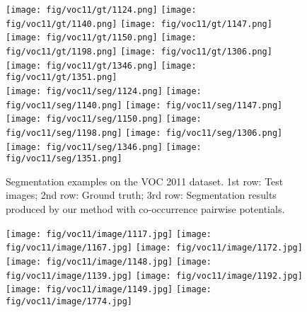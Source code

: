 \documentclass[10pt,3p]{elsarticle}
\begin{document}
\begin{figure}[!t]
	\texttt{[image: fig/voc11/gt/1124.png]}
     \texttt{[image: fig/voc11/gt/1140.png]}     
	\texttt{[image: fig/voc11/gt/1147.png]}
	\texttt{[image: fig/voc11/gt/1150.png]}
     \texttt{[image: fig/voc11/gt/1198.png]}
     \texttt{[image: fig/voc11/gt/1306.png]}   
     \texttt{[image: fig/voc11/gt/1346.png]} 
     \texttt{[image: fig/voc11/gt/1351.png]}\\
 
       
     \texttt{[image: fig/voc11/seg/1124.png]}
     \texttt{[image: fig/voc11/seg/1140.png]}     
	\texttt{[image: fig/voc11/seg/1147.png]}
    \texttt{[image: fig/voc11/seg/1150.png]}
     \texttt{[image: fig/voc11/seg/1198.png]}
     \texttt{[image: fig/voc11/seg/1306.png]}   
     \texttt{[image: fig/voc11/seg/1346.png]} 
     \texttt{[image: fig/voc11/seg/1351.png]}\\


\caption{Segmentation examples on the VOC 2011 dataset. 1st row: Test images; 2nd row: Ground truth; 
3rd row: Segmentation results produced by our method with co-occurrence pairwise potentials. }
    \label{fig:seg_voc11}      
\end{figure}\begin{figure}[!t]
\centering
%
	\texttt{[image: fig/voc11/image/1117.jpg]}
     \texttt{[image: fig/voc11/image/1167.jpg]}     
	\texttt{[image: fig/voc11/image/1172.jpg]}
     \texttt{[image: fig/voc11/image/1148.jpg]}
     \texttt{[image: fig/voc11/image/1139.jpg]}   
     \texttt{[image: fig/voc11/image/1192.jpg]}
     \texttt{[image: fig/voc11/image/1149.jpg]} 
     \texttt{[image: fig/voc11/image/1774.jpg]}\\
     

\end{figure}
\end{document}

